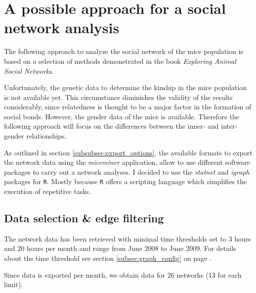\section{A possible approach for a social network analysis}
\label{sec:network_analysis}

The following approach to analyze the social network of the mice population is based on a selection of methods demonstrated in the book \textit{Exploring Animal Social Networks}\citep{croft:07}. 

Unfortunately, the genetic data to determine the kinship in the mice population is not available yet. This circumstance diminishes the validity of the results considerably, since relatedness is thought to be a major factor in the formation of social bonds. However, the gender data of the mice is available. Therefore the following approach will focus on the differences between the inner- and inter-gender relationships.

As outlined in section \ref{subsubsec:export_options}, the available formats to export the network data using the \textit{miceminer} application, allow to use different software packages to carry out a network analyses. I decided to use the \textit{statnet}\citep{statnet:03} and \textit{igraph}\citep{igraph:06} packages for \lstinline|R|\citep{r:05}. Mostly because \lstinline|R| offers a scripting language which simplifies the execution of repetitive tasks. 


\subsection{Data selection \& edge filtering}
\label{subsec:data_selection}


The network data has been retrieved with minimal time thresholds set to 3 hours and 20 hours per month and range from June 2008 to June 2009. For details about the time threshold see section \ref{subsec:graph_config} on page \pageref{subsec:graph_config}.

Since data is exported per month, we obtain data for 26 networks (13 for each limit).

